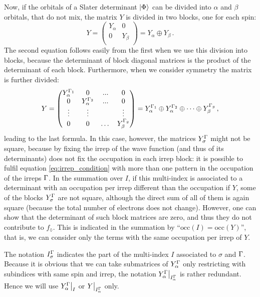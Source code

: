 Now, if the orbitals of a Slater determinant $\ket{\Phi}$ can be divided into $\alpha$ and $\beta$ orbitals, that do not mix, the matrix $Y$ is divided in two blocks, one for each spin:
\begin{equation}
  Y =
  \begin{pmatrix}
    Y_\alpha & 0\\
    0 & Y_\beta\\
  \end{pmatrix}
  = Y_\alpha \oplus Y_\beta\,.
\end{equation}
The second equation follows easily from the first when we use this division into blocks, because the determinant of block diagonal matrices is the product of the determinant of each block.
Furthermore, when we consider symmetry the matrix is further divided:
\begin{equation}\label{eq:Y_spin_irrep_blocks}
  Y =
  \begin{pmatrix}
    Y_\alpha^{\Gamma_1} & 0 & ... & 0\\
    0 & Y_\alpha^{\Gamma_2} & ... & 0 \\
    \vdots & \vdots & & \vdots\\
    0 & 0 &\dots & Y_\beta^{\Gamma_g}\\
  \end{pmatrix}
  = Y_\alpha^{\Gamma_1} \oplus Y_\alpha^{\Gamma_2} \oplus \dots \oplus Y_\beta^{\Gamma_g}\,,
\end{equation}
leading to the last formula.
In this case, however, the matrices $Y_\sigma^{\Gamma}$ might not be square, because by fixing the irrep of the wave function (and thus of its determinants) does not fix the occupation in each irrep block:
it is possible to fulfil equation \eqref{eq:irrep_condition} with more than one pattern in the occupation of the irreps $\Gamma$.
In the summation over $I$, if this multi-index is associated to a determinant with an occupation per irrep different than the occupation if $Y$, some of the blocks $Y_\sigma^{\Gamma}$ are not square, although the direct sum of all of them is again square (because the total number of electrons does not change).
However, one can show that the determinant of such block matrices are zero, and thus they do not contribute to $f_\lozenge$.
This is indicated in the summation by ``$\text{occ}(I) = \text{occ}(Y)$'', that is, we can consider only the terms with the same occupation per irrep of $Y$.

The notation $I_\sigma^{\Gamma}$ indicates the part of the multi-index $I$ associated to $\sigma$ and $\Gamma$.
Because it is obvious that we can take submatrices of $Y_\alpha^{\Gamma}$ only restricting with subindices with same spin and irrep, the notation $Y_\alpha^{\Gamma}\big|_{I_\alpha^{\Gamma}}$ is rather redundant.
Hence we will use $Y_\alpha^{\Gamma}\big|_{I}$ or $Y\big|_{I_\alpha^{\Gamma}}$ only.

